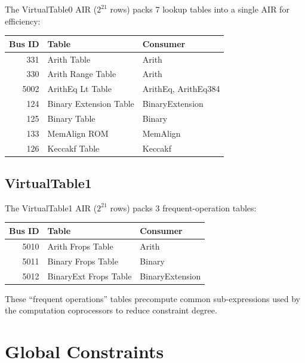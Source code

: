 The VirtualTable0 AIR ($2^{21}$ rows) packs 7 lookup tables into a
single AIR for efficiency:

\begin{center}
\renewcommand{\arraystretch}{1.2}
\begin{tabular}{@{}rll@{}}
  \toprule
  Bus ID & Table & Consumer \\
  \midrule
  331  & Arith Table          & Arith \\
  330  & Arith Range Table    & Arith \\
  5002 & ArithEq Lt Table     & ArithEq, ArithEq384 \\
  124  & Binary Extension Table & BinaryExtension \\
  125  & Binary Table         & Binary \\
  133  & MemAlign ROM         & MemAlign \\
  126  & Keccakf Table        & Keccakf \\
  \bottomrule
\end{tabular}
\end{center}

\subsection{VirtualTable1}
\label{sec:vt1}

The VirtualTable1 AIR ($2^{21}$ rows) packs 3 frequent-operation
tables:

\begin{center}
\renewcommand{\arraystretch}{1.2}
\begin{tabular}{@{}rll@{}}
  \toprule
  Bus ID & Table & Consumer \\
  \midrule
  5010 & Arith Frops Table        & Arith \\
  5011 & Binary Frops Table       & Binary \\
  5012 & BinaryExt Frops Table    & BinaryExtension \\
  \bottomrule
\end{tabular}
\end{center}

These ``frequent operations'' tables precompute common sub-expressions
used by the computation coprocessors to reduce constraint degree.

\section{Global Constraints}
\label{sec:zisk-global-constraints}

